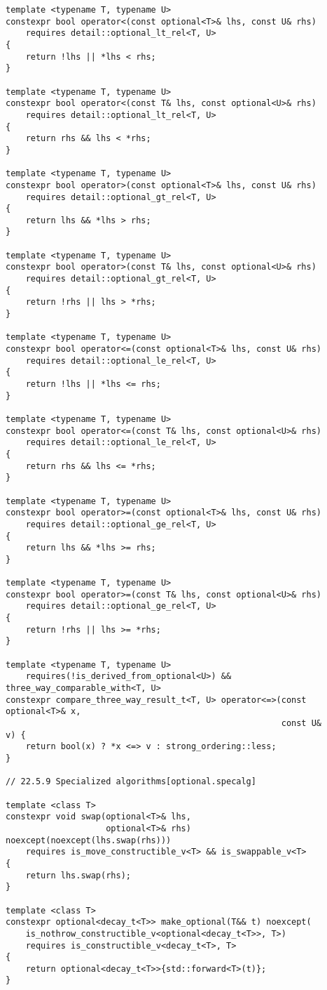 \documentclass[a4paper,10pt,oneside,openany,final,article]{memoir}
\begin{document}
\begin{verbatim}
template <typename T, typename U>
constexpr bool operator<(const optional<T>& lhs, const U& rhs)
    requires detail::optional_lt_rel<T, U>
{
    return !lhs || *lhs < rhs;
}

template <typename T, typename U>
constexpr bool operator<(const T& lhs, const optional<U>& rhs)
    requires detail::optional_lt_rel<T, U>
{
    return rhs && lhs < *rhs;
}

template <typename T, typename U>
constexpr bool operator>(const optional<T>& lhs, const U& rhs)
    requires detail::optional_gt_rel<T, U>
{
    return lhs && *lhs > rhs;
}

template <typename T, typename U>
constexpr bool operator>(const T& lhs, const optional<U>& rhs)
    requires detail::optional_gt_rel<T, U>
{
    return !rhs || lhs > *rhs;
}

template <typename T, typename U>
constexpr bool operator<=(const optional<T>& lhs, const U& rhs)
    requires detail::optional_le_rel<T, U>
{
    return !lhs || *lhs <= rhs;
}

template <typename T, typename U>
constexpr bool operator<=(const T& lhs, const optional<U>& rhs)
    requires detail::optional_le_rel<T, U>
{
    return rhs && lhs <= *rhs;
}

template <typename T, typename U>
constexpr bool operator>=(const optional<T>& lhs, const U& rhs)
    requires detail::optional_ge_rel<T, U>
{
    return lhs && *lhs >= rhs;
}

template <typename T, typename U>
constexpr bool operator>=(const T& lhs, const optional<U>& rhs)
    requires detail::optional_ge_rel<T, U>
{
    return !rhs || lhs >= *rhs;
}

template <typename T, typename U>
    requires(!is_derived_from_optional<U>) && three_way_comparable_with<T, U>
constexpr compare_three_way_result_t<T, U> operator<=>(const optional<T>& x,
                                                       const U&           v) {
    return bool(x) ? *x <=> v : strong_ordering::less;
}

// 22.5.9 Specialized algorithms[optional.specalg]

template <class T>
constexpr void swap(optional<T>& lhs,
                    optional<T>& rhs) noexcept(noexcept(lhs.swap(rhs)))
    requires is_move_constructible_v<T> && is_swappable_v<T>
{
    return lhs.swap(rhs);
}

template <class T>
constexpr optional<decay_t<T>> make_optional(T&& t) noexcept(
    is_nothrow_constructible_v<optional<decay_t<T>>, T>)
    requires is_constructible_v<decay_t<T>, T>
{
    return optional<decay_t<T>>{std::forward<T>(t)};
}


\end{verbatim}
\end{document}
